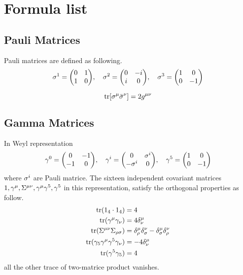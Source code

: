 \chapter{Formula list}

\section{Pauli Matrices}

Pauli matrices are defined as following.
\begin{equation} 
  \s^1 = \mqty( 0 & 1 \\
                1 & 0),\quad
  \s^2 = \mqty( 0 & -i \\
                i & 0),\quad
  \s^3 = \mqty( 1 & 0 \\
                0 & -1)
\end{equation}

\begin{equation} \label{eq:pauli-matrices-1}
  \operatorname{tr}[\sigma^{\mu}\bar{\sigma}^{\nu}] = 2 g^{\mu\nu}
\end{equation}

\section{Gamma Matrices}

In Weyl representation
\begin{equation} 
  \g^0 = \mqty(  0 & -1\\
                -1 &  0),\quad
  \g^i = \mqty(  0 &  \s^{i}\\
            -\s^{i}&   0   ),\quad
  \g^5 = \mqty(  1 &  0\\
                 0 & -1)
\end{equation}
where $\sigma^i$ are Pauli matrice.
The sixteen independent covariant matrices $1,\gamma^{\mu},\Sigma^{\mu\nu},\gamma^{\mu}\gamma^5,\gamma^5$ in this representation, satisfy the orthogonal properties as follow.
\begin{align}\label{orthogonal property of 16 covariant matrices}
  \text{tr}(1_{4}\cdot1_{4}) &= 4\notag\\
  \text{tr}(\gamma^{\mu}\gamma_{\nu}) &= 4\delta^{\mu}_{\nu}\notag\\
  \text{tr}(\Sigma^{\mu\nu}\Sigma_{\rho\sigma}) 
  &= \delta^{\mu}_{\rho}\delta^{\nu}_{\sigma}-\delta^{\mu}_{\sigma}\delta^{\nu}_{\rho}\\
   \text{tr}(\gamma_5\gamma^{\mu}\gamma^{5}\gamma_{\nu}) &= -4 \delta^{\mu}_{\nu}\notag\\
   \text{tr}(\gamma^{5}\gamma_{5}) &= 4\notag
\end{align}
all the other trace of two-matrice product vanishes. 